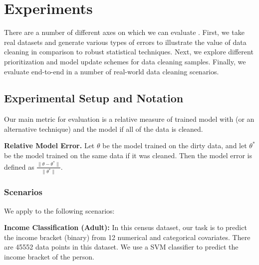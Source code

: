 \section{Experiments}
There are a number of different axes on which we can evaluate \sys.
First, we take real datasets and generate various types of errors to illustrate the value of data cleaning in comparison to robust statistical techniques.
Next, we explore different prioritization and model update schemes for data cleaning samples.
Finally, we evaluate \sys end-to-end in a number of real-world data cleaning scenarios.

\subsection{Experimental Setup and Notation}
Our main metric for evaluation is a relative measure of trained model with \sys (or an alternative technique) and the model if all of the data is cleaned.

\vspace{0.5em}

\noindent\textbf{Relative Model Error. } Let $\theta$ be the model trained on the dirty data, and let $\theta^*$ be the model trained on the same data if it was cleaned. Then the model error is defined as $\frac{\|\theta - \theta^*\|}{\|\theta^*\|}$.

\subsubsection{Scenarios}
\noindent We apply \sys to the following scenarios:



\vspace{0.5em}

\noindent\textbf{Income Classification (Adult): } In this census dataset, our task is to predict the income bracket (binary) from 12 numerical and categorical covariates. There are 45552 data points in this dataset. We use a SVM classifier to predict the income bracket of the person.

\vspace{0.5em}

